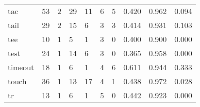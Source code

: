 \begin{longtable}{lp{1.3cm}p{1.3cm}p{1.3cm}p{1.3cm}p{1.3cm}p{1.3cm}p{1.3cm}p{1.3cm}p{1.3cm}}
tac       &                     53 &                                             2 &                                           29 &                                          11 &                                            6 &                                          5 &                                0.420 &                                  0.962 &                                0.094 \\
tail      &                     29 &                                             2 &                                           15 &                                           6 &                                            3 &                                          3 &                                0.414 &                                  0.931 &                                0.103 \\
tee       &                     10 &                                             1 &                                            5 &                                           1 &                                            3 &                                          0 &                                0.400 &                                  0.900 &                                0.000 \\
test      &                     24 &                                             1 &                                           14 &                                           6 &                                            3 &                                          0 &                                0.365 &                                  0.958 &                                0.000 \\
timeout   &                     18 &                                             1 &                                            6 &                                           1 &                                            4 &                                          6 &                                0.611 &                                  0.944 &                                0.333 \\
touch     &                     36 &                                             1 &                                           13 &                                          17 &                                            4 &                                          1 &                                0.438 &                                  0.972 &                                0.028 \\
tr        &                     13 &                                             1 &                                            6 &                                           1 &                                            5 &                                          0 &                                0.442 &                                  0.923 &                                0.000 \\

\end{longtable}
